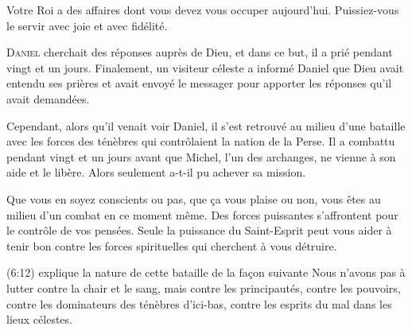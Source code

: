 Votre Roi a des affaires dont vous devez vous occuper aujourd'hui.
 Puissiez-vous le servir avec joie et avec fidélité. 

\dvrule








\lettrine{D}{aniel} cherchait des réponses auprès de Dieu,
 et dans ce but, il a prié pendant vingt et un jours.
 Finalement, un visiteur céleste a informé Daniel que Dieu avait entendu
 ses prières et avait envoyé le messager pour apporter les réponses
 qu'il avait demandées. 

Cependant, alors qu'il venait voir Daniel, il s'est retrouvé au milieu
 d'une bataille avec les forces des ténèbres qui contrôlaient
 la nation de la Perse. Il a combattu pendant vingt et un jours
 avant que Michel, l'un des archanges, ne vienne à son aide et le libère.
 Alors seulement a-t-il pu achever sa mission. 


Que vous en soyez conscients ou pas, que \c{c}a vous plaise ou non,
 vous êtes au milieu d'un combat en ce moment même.
 Des forces puissantes s'affrontent pour le contrôle de vos pensées.
 Seule la puissance du Saint-Esprit peut vous aider à tenir bon contre
 les forces spirituelles qui cherchent à vous détruire. 

(6:12) explique la nature de cette bataille
 de la fa\c{c}on suivante\frcolon{} \Og Nous n'avons pas à lutter contre la chair
 et le sang, mais contre les principautés, contre les pouvoirs,
 contre les dominateurs des ténèbres d'ici-bas,
 contre les esprits du mal dans les lieux célestes. \Fg{}


